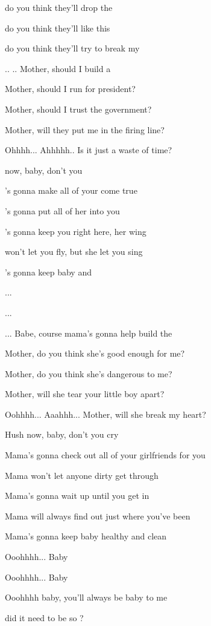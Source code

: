 
\zs
{} do you think they'll drop the   

 do you think they'll like this    

  do you think they'll try to break my 

..   .. Mother, should I build a 
\ks

\zs
Mother, should I run for president?

Mother, should I trust the government?

Mother, will they put me in the firing line?

Ohhhh...  Ahhhhh.. Is it just a waste of time?
\ks

\zr
{} now, baby, don't you 

's gonna make all of your  come true

's gonna put all of her  into you

's gonna keep you right here,  her wing

 won't let you fly, but she  let you sing

's gonna keep baby  and 

...  

...  

... Babe,  course mama's gonna help build the 
\kr

\zs
Mother, do you think she's good enough for me?

Mother, do you think she's dangerous to me?

Mother, will she tear your little boy apart?

Oohhhh... Aaahhh... Mother, will she break my heart?
\ks

\zr
Hush now, baby, don't you cry

Mama's gonna check out all of your girlfriends for you

Mama won't let anyone dirty get through

Mama's gonna wait up until you get in

Mama will always find out just where you've been

Mama's gonna keep baby healthy and clean

Ooohhhh...  Baby

Ooohhhh...  Baby

Ooohhhh baby, you'll always be baby to me

 did it need to be so ?
\kr

\kp

